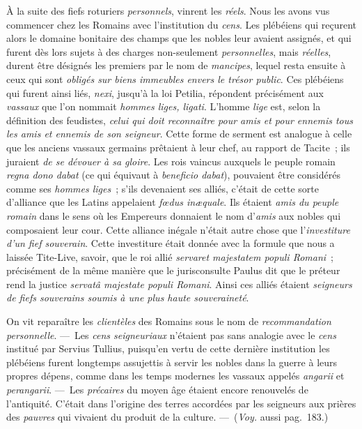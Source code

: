 \documentclass[french,twoside]{book} %
\begin{document}
À la suite des fiefs roturiers {\itshape personnels}, vinrent les {\itshape réels}. Nous les avons vus commencer chez les Romains avec l’institution du {\itshape cens}. Les plébéiens qui reçurent alors le domaine bonitaire des champs que les nobles leur avaient assignés, et qui furent dès lors sujets à des charges non-seulement {\itshape personnelles}, mais {\itshape réelles}, durent être désignés les premiers par le nom de {\itshape mancipes}, lequel resta ensuite à ceux qui sont {\itshape obligés sur biens immeubles envers le trésor public}. Ces plébéiens qui furent ainsi liés, {\itshape nexi}, jusqu’à la loi Petilia, répondent précisément aux {\itshape vassaux} que l’on nommait {\itshape hommes liges, ligati}. L’homme {\itshape lige} est, selon la définition des feudistes, {\itshape celui qui doit reconnaître pour amis et pour ennemis tous les amis et ennemis de son seigneur}. Cette forme de serment est analogue à celle que les anciens vassaux germains prêtaient à leur chef, au rapport de Tacite ; ils juraient \emph{{\itshape de se dévouer à sa gloire}}. Les rois vaincus auxquels le peuple romain  {\itshape regna dono dabat} (ce qui équivaut à {\itshape beneficio dabat}), pouvaient être considérés comme ses {\itshape hommes liges} ; s’ils devenaient ses alliés, c’était de cette sorte d’alliance que les Latins appelaient {\itshape fœdus inæquale}. Ils étaient {\itshape amis du peuple romain} dans le sens où les Empereurs donnaient le nom d’{\itshape amis} aux nobles qui composaient leur cour. Cette alliance inégale n’était autre chose que l’{\itshape investiture d’un fief souverain}. Cette investiture était donnée avec la formule que nous a laissée Tite-Live, savoir, que le roi allié \emph{{\itshape servaret majestatem populi Romani}} ; précisément de la même manière que le jurisconsulte Paulus dit que le préteur rend la justice \emph{{\itshape servatâ majestate populi Romani}}. Ainsi ces alliés étaient {\itshape seigneurs de fiefs souverains soumis à une plus haute souveraineté}.\par
On vit reparaître les {\itshape clientèles} des Romains sous le nom de {\itshape recommandation personnelle}. — Les {\itshape cens seigneuriaux} n’étaient pas sans analogie avec le {\itshape cens} institué par Servius Tullius, puisqu’en vertu de cette dernière institution les plébéiens furent longtemps assujettis à servir les nobles dans la guerre à leurs propres dépens, comme dans les temps modernes les vassaux appelés {\itshape angarii} et {\itshape perangarii}. — Les {\itshape précaires} du moyen âge étaient encore renouvelés de l’antiquité. C’était dans l’origine des terres accordées par les seigneurs aux prières des {\itshape pauvres} qui vivaient du produit de la culture. — ({\itshape Voy.} aussi pag. 183.)\par
\end{document}
